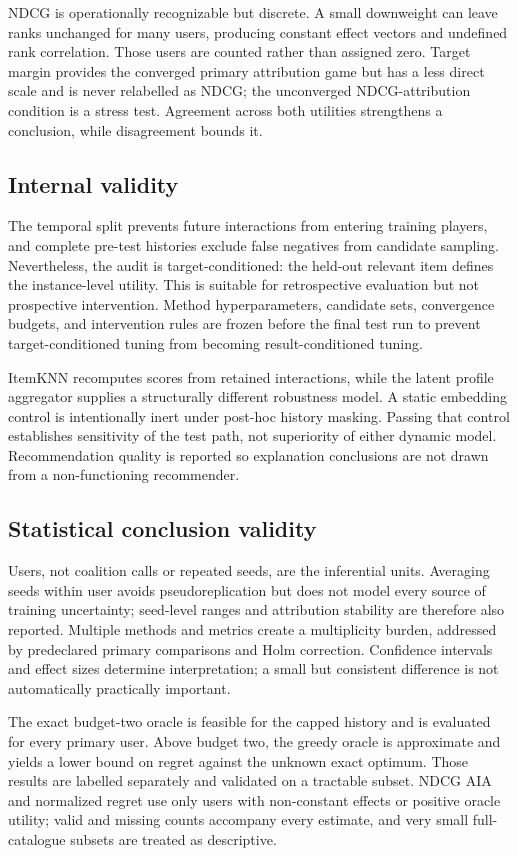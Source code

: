 \documentclass[pdflatex,sn-basic]{sn-jnl}
\begin{document}
NDCG is operationally recognizable but discrete. A small downweight can leave ranks unchanged for many users, producing constant effect vectors and undefined rank correlation. Those users are counted rather than assigned zero. Target margin provides the converged primary attribution game but has a less direct scale and is never relabelled as NDCG; the unconverged NDCG-attribution condition is a stress test. Agreement across both utilities strengthens a conclusion, while disagreement bounds it.

\subsection{Internal validity}
The temporal split prevents future interactions from entering training players, and complete pre-test histories exclude false negatives from candidate sampling. Nevertheless, the audit is target-conditioned: the held-out relevant item defines the instance-level utility. This is suitable for retrospective evaluation but not prospective intervention. Method hyperparameters, candidate sets, convergence budgets, and intervention rules are frozen before the final test run to prevent target-conditioned tuning from becoming result-conditioned tuning.

ItemKNN recomputes scores from retained interactions, while the latent profile aggregator supplies a structurally different robustness model. A static embedding control is intentionally inert under post-hoc history masking. Passing that control establishes sensitivity of the test path, not superiority of either dynamic model. Recommendation quality is reported so explanation conclusions are not drawn from a non-functioning recommender.

\subsection{Statistical conclusion validity}
Users, not coalition calls or repeated seeds, are the inferential units. Averaging seeds within user avoids pseudoreplication but does not model every source of training uncertainty; seed-level ranges and attribution stability are therefore also reported. Multiple methods and metrics create a multiplicity burden, addressed by predeclared primary comparisons and Holm correction. Confidence intervals and effect sizes determine interpretation; a small but consistent difference is not automatically practically important.

The exact budget-two oracle is feasible for the capped history and is evaluated for every primary user. Above budget two, the greedy oracle is approximate and yields a lower bound on regret against the unknown exact optimum. Those results are labelled separately and validated on a tractable subset. NDCG AIA and normalized regret use only users with non-constant effects or positive oracle utility; valid and missing counts accompany every estimate, and very small full-catalogue subsets are treated as descriptive.
\end{document}

